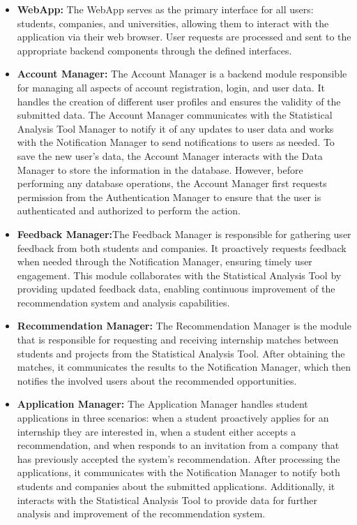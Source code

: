 \begin{itemize}
    \item \textbf{WebApp:} The WebApp serves as the primary interface for all users: students, companies, and universities, allowing them to interact with the application via their web browser. User requests are processed and sent to the appropriate backend components through the defined interfaces.
    \item \textbf{Account Manager:} The Account Manager is a backend module responsible for managing all aspects of account registration, login, and user data. It handles the creation of different user profiles and ensures the validity of the submitted data. The Account Manager communicates with the Statistical Analysis Tool Manager to notify it of any updates to user data and works with the Notification Manager to send notifications to users as needed. To save the new user's data, the Account Manager interacts with the Data Manager to store the information in the database. However, before performing any database operations, the Account Manager first requests permission from the Authentication Manager to ensure that the user is authenticated and authorized to perform the action.
    \item \textbf{Feedback Manager:}The Feedback Manager is responsible for gathering user feedback from both students and companies. It proactively requests feedback when needed through the Notification Manager, ensuring timely user engagement. This module collaborates with the Statistical Analysis Tool by providing updated feedback data, enabling continuous improvement of the recommendation system and analysis capabilities.
    \item \textbf{Recommendation Manager:} The Recommendation Manager is the module that is responsible for requesting and receiving internship matches between students and projects from the Statistical Analysis Tool. After obtaining the matches, it communicates the results to the Notification Manager, which then notifies the involved users about the recommended opportunities.
    \item \textbf{Application Manager:} The Application Manager handles student applications in three scenarios: when a student proactively applies for an internship they are interested in, when a student either accepts a recommendation, and when responds to an invitation from a company that has previously accepted the system's recommendation. After processing the applications, it communicates with the Notification Manager to notify both students and companies about the submitted applications. Additionally, it interacts with the Statistical Analysis Tool to provide data for further analysis and improvement of the recommendation system.

\end{itemize}

